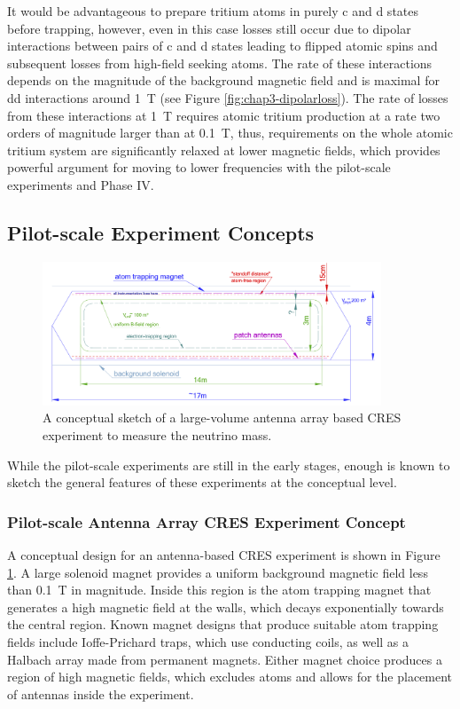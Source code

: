 It would be advantageous to prepare tritium atoms in purely c and d states before trapping, however, even in this case losses still occur due to dipolar interactions between pairs of c and d states leading to flipped atomic spins and subsequent losses from high-field seeking atoms. The rate of these interactions depends on the magnitude of the background magnetic field and is maximal for dd interactions around 1~T (see Figure \ref{fig:chap3-dipolarloss}). The rate of losses from these interactions at 1~T requires atomic tritium production at a rate two orders of magnitude larger than at 0.1~T, thus, requirements on the whole atomic tritium system are significantly relaxed at lower magnetic fields, which provides powerful argument for moving to lower frequencies with the pilot-scale experiments and Phase IV.

\subsection{Pilot-scale Experiment Concepts}

\begin{figure}[htbp]
    \centering
    \includegraphics*[width=0.9\textwidth]{figs/Chapter-3/phaseiv_concept_sketch_ver2.png}
    \caption{\label{fig:chap3-phaseiv-antenna} A conceptual sketch of a large-volume antenna array based CRES experiment to measure the neutrino mass.}
\end{figure}

While the pilot-scale experiments are still in the early stages, enough is known to sketch the general features of these experiments at the conceptual level. 

\subsubsection*{Pilot-scale Antenna Array CRES Experiment Concept}

A conceptual design for an antenna-based CRES experiment is shown in Figure \ref{fig:chap3-phaseiv-antenna}. A large solenoid magnet provides a uniform background magnetic field less than 0.1~T in magnitude. Inside this region is the atom trapping magnet that generates a high magnetic field at the walls, which decays exponentially towards the central region. 
Known magnet designs that produce suitable atom trapping fields include Ioffe-Prichard traps, which use conducting coils, as well as a Halbach array made from permanent magnets. Either magnet choice produces a region of high magnetic fields, which excludes atoms and allows for the placement of antennas inside the experiment. 

